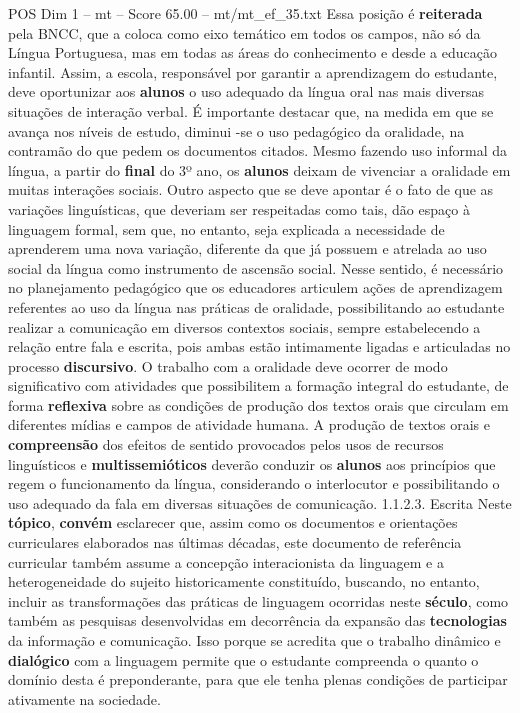\begin{textsample}{POS Dim 1 – mt – Score 65.00 – mt/mt\_ef\_35.txt}
Essa posição é \textbf{reiterada} pela BNCC, que a coloca como eixo temático em todos os campos, não só da Língua Portuguesa, mas em todas as áreas do conhecimento e desde a educação infantil.
Assim, a escola, responsável por garantir a aprendizagem do estudante, deve oportunizar aos \textbf{alunos} o uso adequado da língua oral nas mais diversas situações de interação verbal.
É importante destacar que, na medida em que se avança nos níveis de estudo, diminui -se o uso pedagógico da oralidade, na contramão do que pedem os documentos citados.
Mesmo fazendo uso informal da língua, a partir do \textbf{final} do 3º ano, os \textbf{alunos} deixam de vivenciar a oralidade em muitas interações sociais.
Outro aspecto que se deve apontar é o fato de que as variações linguísticas, que deveriam ser respeitadas como tais, dão espaço à linguagem formal, sem que, no entanto, seja explicada a necessidade de aprenderem uma nova variação, diferente da que já possuem e atrelada ao uso social da língua como instrumento de ascensão social.
Nesse sentido, é necessário no planejamento pedagógico que os educadores articulem ações de aprendizagem referentes ao uso da língua nas práticas de oralidade, possibilitando ao estudante realizar a comunicação em diversos contextos sociais, sempre estabelecendo a relação entre fala e escrita, pois ambas estão intimamente ligadas e articuladas no processo \textbf{discursivo}.
O trabalho com a oralidade deve ocorrer de modo significativo com atividades que possibilitem a formação integral do estudante, de forma \textbf{reflexiva} sobre as condições de produção dos textos orais que circulam em diferentes mídias e campos de atividade humana.
A produção de textos orais e \textbf{compreensão} dos efeitos de sentido provocados pelos usos de recursos linguísticos e \textbf{multissemióticos} deverão conduzir os \textbf{alunos} aos princípios que regem o funcionamento da língua, considerando o interlocutor e possibilitando o uso adequado da fala em diversas situações de comunicação. 1.1.2.3.
Escrita Neste \textbf{tópico}, \textbf{convém} esclarecer que, assim como os documentos e orientações curriculares elaborados nas últimas décadas, este documento de referência curricular também assume a concepção interacionista da linguagem e a heterogeneidade do sujeito historicamente constituído, buscando, no entanto, incluir as transformações das práticas de linguagem ocorridas neste \textbf{século}, como também as pesquisas desenvolvidas em decorrência da expansão das \textbf{tecnologias} da informação e comunicação.
Isso porque se acredita que o trabalho dinâmico e \textbf{dialógico} com a linguagem permite que o estudante compreenda o quanto o domínio desta é preponderante, para que ele tenha plenas condições de participar ativamente na sociedade.

\end{textsample}
